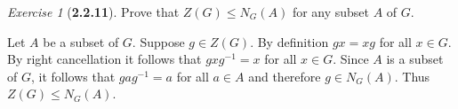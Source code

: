 \documentclass[12pt]{amsart}
\makeatletter
\theoremstyle{remark}
\newtheorem*{exercise}{Exercise}%
\renewenvironment{proof}[1][\proofname]{\par\doublespacing
  \pushQED{\qed}%
  \normalfont \topsep6\p@\@plus6\p@\relax
  \list{}{%
    \settowidth{\leftmargin}{\itshape\proofname:\hskip\labelsep}%
    \setlength{\labelwidth}{0pt}%
    \setlength{\itemindent}{-\leftmargin}%
  }%
  \item[\hskip\labelsep\itshape#1\@addpunct{:}]\ignorespaces
}{%
  \popQED\endlist\@endpefalse
  \singlespacing
}
\theoremstyle{mycomment}
\makeatother
\begin{document}
\begin{exercise}[\textbf{2.2.11}] Prove that $Z(G) \leq N_G(A)$ for any subset $A$ of $G$.
  \begin{proof} Let $A$ be a subset of $G$. Suppose $g \in Z(G)$. By definition $gx = xg$ for all $x \in G$. By right cancellation it follows that 
    $gxg^{-1} = x$ for all $x\in G$. Since $A$ is a subset of $G$, it follows that $gag^{-1} = a$ for all $a \in A$ and therefore $g\in  N_G(A)$. Thus
    $Z(G) \leq N_G(A)$. 
  \end{proof}
\end{exercise}
\vspace{.15in}
\end{document}
